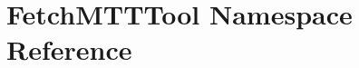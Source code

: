 \hypertarget{namespaceFetchMTTTool}{\section{Fetch\-M\-T\-T\-Tool Namespace Reference}
\label{namespaceFetchMTTTool}
}
